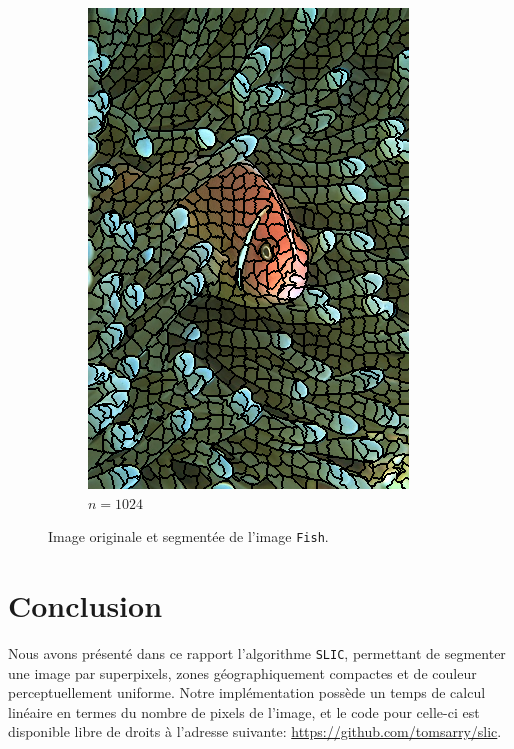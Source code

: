 \documentclass[12pt]{article}
\newcommand{\slic}{\texttt{SLIC}}
\begin{document}
\begin{figure}
\begin{subfigure}{0.48\textwidth}
    \includegraphics[width=.8\textwidth]{fish/fish_segmented_1024.png}
    \caption{$n=1024$}
  \end{subfigure}
  \caption{Image originale et segment\'ee de l'image \texttt{Fish}.}
  \label{fig:fish_segm}
\end{figure}

\section{Conclusion}

Nous avons pr\'esent\'e dans ce rapport l'algorithme \slic, permettant de segmenter une image par superpixels,
zones g\'eographiquement compactes et de couleur perceptuellement uniforme.
Notre impl\'ementation poss\`ede un temps de calcul lin\'eaire en termes du nombre de pixels de l'image, et le code pour celle-ci est disponible libre de droits \`a l'adresse suivante:
\url{https://github.com/tomsarry/slic}.

\newpage
\AtNextBibliography{\small}
\printbibliography
\end{document}
